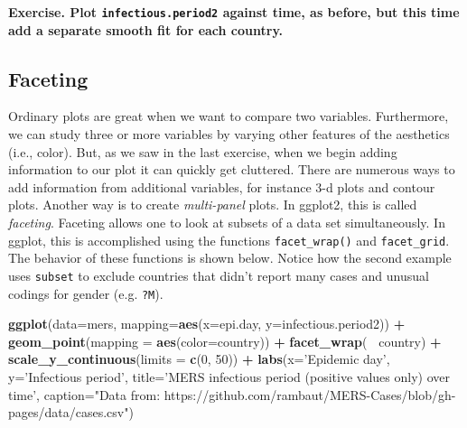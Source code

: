 \documentclass[]{article}
\newenvironment{Shaded}{\begin{snugshade}}{\end{snugshade}}
\newcommand{\KeywordTok}[1]{\textcolor[rgb]{0.13,0.29,0.53}{\textbf{#1}}}
\newcommand{\DataTypeTok}[1]{\textcolor[rgb]{0.13,0.29,0.53}{#1}}
\newcommand{\DecValTok}[1]{\textcolor[rgb]{0.00,0.00,0.81}{#1}}
\newcommand{\StringTok}[1]{\textcolor[rgb]{0.31,0.60,0.02}{#1}}
\newcommand{\OperatorTok}[1]{\textcolor[rgb]{0.81,0.36,0.00}{\textbf{#1}}}
\newcommand{\NormalTok}[1]{#1}
\begin{document}
\textbf{Exercise. Plot \texttt{infectious.period2} against time, as
before, but this time add a separate smooth fit for each country.}

\hypertarget{faceting}{%
\subsection{Faceting}\label{faceting}}

Ordinary plots are great when we want to compare two variables.
Furthermore, we can study three or more variables by varying other
features of the aesthetics (i.e., color). But, as we saw in the last
exercise, when we begin adding information to our plot it can quickly
get cluttered. There are numerous ways to add information from
additional variables, for instance 3-d plots and contour plots. Another
way is to create \emph{multi-panel} plots. In ggplot2, this is called
\emph{faceting}. Faceting allows one to look at subsets of a data set
simultaneously. In ggplot, this is accomplished using the functions
\texttt{facet\_wrap()} and \texttt{facet\_grid}. The behavior of these
functions is shown below. Notice how the second example uses
\texttt{subset} to exclude countries that didn't report many cases and
unusual codings for gender (e.g. \texttt{?M}).

\begin{Shaded}
\begin{Highlighting}[]
\KeywordTok{ggplot}\NormalTok{(}\DataTypeTok{data=}\NormalTok{mers, }\DataTypeTok{mapping=}\KeywordTok{aes}\NormalTok{(}\DataTypeTok{x=}\NormalTok{epi.day, }\DataTypeTok{y=}\NormalTok{infectious.period2)) }\OperatorTok{+}\StringTok{ }
\StringTok{  }\KeywordTok{geom_point}\NormalTok{(}\DataTypeTok{mapping =} \KeywordTok{aes}\NormalTok{(}\DataTypeTok{color=}\NormalTok{country)) }\OperatorTok{+}
\StringTok{  }\KeywordTok{facet_wrap}\NormalTok{(}\OperatorTok{~}\StringTok{ }\NormalTok{country) }\OperatorTok{+}\StringTok{ }
\StringTok{  }\KeywordTok{scale_y_continuous}\NormalTok{(}\DataTypeTok{limits =} \KeywordTok{c}\NormalTok{(}\DecValTok{0}\NormalTok{, }\DecValTok{50}\NormalTok{)) }\OperatorTok{+}
\StringTok{   }\KeywordTok{labs}\NormalTok{(}\DataTypeTok{x=}\StringTok{'Epidemic day'}\NormalTok{, }\DataTypeTok{y=}\StringTok{'Infectious period'}\NormalTok{,}
       \DataTypeTok{title=}\StringTok{'MERS infectious period (positive values only) over time'}\NormalTok{, }\DataTypeTok{caption=}\StringTok{"Data from: https://github.com/rambaut/MERS-Cases/blob/gh-pages/data/cases.csv"}\NormalTok{)}
\end{Highlighting}
\end{Shaded}
\end{document}

